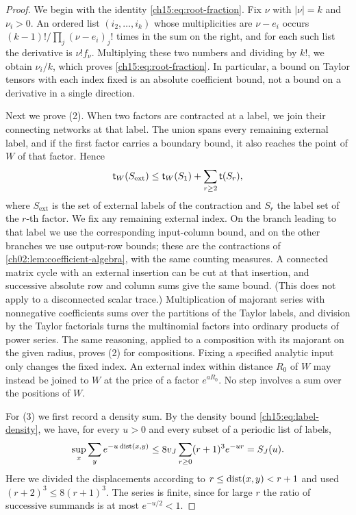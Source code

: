 \begin{proof}
We begin with the identity \eqref{ch15:eq:root-fraction}. Fix $\nu$ with $|\nu|=k$ and $\nu_i>0$. An ordered list $(i_2,\ldots,i_k)$ whose multiplicities are $\nu-e_i$ occurs $(k-1)!/\prod_j(\nu-e_i)_j!$ times in the sum on the right, and for each such list the derivative is $\nu!f_\nu$. Multiplying these two numbers and dividing by $k!$, we obtain $\nu_i/k$, which proves \eqref{ch15:eq:root-fraction}. In particular, a bound on Taylor tensors with each index fixed is an absolute coefficient bound, not a bound on a derivative in a single direction.

Next we prove (2). When two factors are contracted at a label, we join their connecting networks at that label. The union spans every remaining external label, and if the first factor carries a boundary bound, it also reaches the point of $W$ of that factor. Hence
\begin{equation}\label{ch15:eq:wall-union}
 \mathsf t_W(S_{\mathrm{ext}})
       \le\mathsf t_W(S_1)+\sum_{r\ge2}\mathsf t(S_r),
\end{equation}
where $S_{\mathrm{ext}}$ is the set of external labels of the contraction and $S_r$ the label set of the $r$-th factor. We fix any remaining external index. On the branch leading to that label we use the corresponding input-column bound, and on the other branches we use output-row bounds; these are the contractions of \cref{ch02:lem:coefficient-algebra}, with the same counting measures. A connected matrix cycle with an external insertion can be cut at that insertion, and successive absolute row and column sums give the same bound. (This does not apply to a disconnected scalar trace.) Multiplication of majorant series with nonnegative coefficients sums over the partitions of the Taylor labels, and division by the Taylor factorials turns the multinomial factors into ordinary products of power series. The same reasoning, applied to a composition with its majorant on the given radius, proves (2) for compositions. Fixing a specified analytic input only changes the fixed index. An external index within distance $R_0$ of $W$ may instead be joined to $W$ at the price of a factor $e^{aR_0}$. No step involves a sum over the positions of $W$.

For (3) we first record a density sum. By the density bound \eqref{ch15:eq:label-density}, we have, for every $u>0$ and every subset of a periodic list of labels,
\begin{equation}\label{ch15:eq:density-sum}
 \sup_x\sum_y e^{-u\operatorname{dist}(x,y)}
 \le 8v_J\sum_{r\ge0}(r+1)^3e^{-ur}=S_J(u).
\end{equation}
Here we divided the displacements according to $r\le\operatorname{dist}(x,y)<r+1$ and used $(r+2)^3\le8(r+1)^3$. The series is finite, since for large $r$ the ratio of successive summands is at most $e^{-u/2}<1$.


\end{proof}
